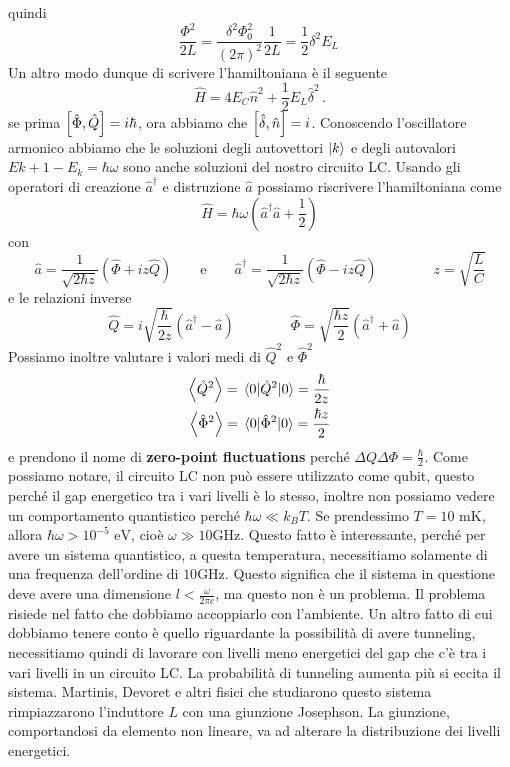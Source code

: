 quindi 
\begin{equation*}
    \frac{\Phi^2}{2L} = \frac{\delta^2\Phi_0^2}{(2\pi)^2}\frac{1}{2L} = \frac{1}{2}\delta^2E_L \,
\end{equation*}
Un altro modo dunque di scrivere l'hamiltoniana è il seguente
\begin{equation*}
    \hat H = 4 E_C \hat n^2 + \frac 12 E_L \hat \delta^2 \, .
\end{equation*}
se prima $\comm{\hat \Phi}{\hat Q} = i\hbar$, ora abbiamo che $\comm{\hat \delta}{\hat n} = i$.
Conoscendo l'oscillatore armonico abbiamo che le soluzioni degli autovettori $\ket k$ e degli autovalori $E{k+1} - E_k = \hbar \omega$ sono anche soluzioni del nostro circuito LC. Usando gli operatori di creazione $\hat a^\dagger$ e distruzione $\hat a$ possiamo riscrivere l'hamiltoniana come
\begin{equation*}
    \hat H = \hbar \omega \left(\hat a^\dagger \hat a + \frac 12 \right)
\end{equation*}
con 
\begin{equation*}
    \hat a = \frac{1}{\sqrt{2\hbar z}}\left(\hat \Phi + iz \hat Q\right) \qquad \text{e} \qquad \hat a^\dagger = \frac{1}{\sqrt{2\hbar z}}\left(\hat \Phi - iz \hat Q\right) \qquad \qquad z = \sqrt{\frac{L}{C}}
\end{equation*}
e le relazioni inverse
\begin{equation*}
    \hat Q = i\sqrt{\frac{\hbar}{2z}}\left(\hat a^\dagger - \hat a\right) \qquad \qquad \hat \Phi = \sqrt{\frac{\hbar z}{2}}\left(\hat a^\dagger + \hat a\right)
\end{equation*}
Possiamo inoltre valutare i valori medi di $\hat Q^2$ e $\hat \Phi^2$
\begin{align*}
    \expval{\hat Q^2} = \expval{\hat Q^2}{0} = \frac{\hbar}{2z} \\
    \expval{\hat \Phi^2} = \expval{\hat \Phi^2}{0} = \frac{\hbar z}{2}
\end{align*}
e prendono il nome di \textbf{zero-point fluctuations} perché $\Delta Q \Delta \Phi = \frac{\hbar}{2}$.
Come possiamo notare, il circuito LC non può essere utilizzato come qubit, questo perché il gap energetico tra i vari livelli è lo stesso, inoltre non possiamo vedere un comportamento quantistico perché $\hbar \omega \ll k_BT$. Se prendessimo $T=10 \text{ mK}$, allora $\hbar\omega > 10^{-5}\text{ eV}$, cioè $\omega \gg 10 \text{GHz}$.
Questo fatto è interessante, perché per avere un sistema quantistico, a questa temperatura, necessitiamo solamente di una frequenza dell'ordine di $10 \text{GHz}$. Questo significa che il sistema in questione deve avere una dimensione $l < \frac{\omega}{2\pi c}$, ma questo non è un problema. Il problema risiede nel fatto che dobbiamo accoppiarlo con l'ambiente.
Un altro fatto di cui dobbiamo tenere conto è quello riguardante la possibilità di avere tunneling, necessitiamo quindi di lavorare con livelli meno energetici del gap che c'è tra i vari livelli in un circuito LC. La probabilità di tunneling aumenta più si eccita il sistema. Martinis, Devoret e altri fisici che studiarono questo sistema rimpiazzarono l'induttore $L$ con una giunzione Josephson. La giunzione, comportandosi da elemento non lineare, va ad alterare la distribuzione dei livelli energetici.